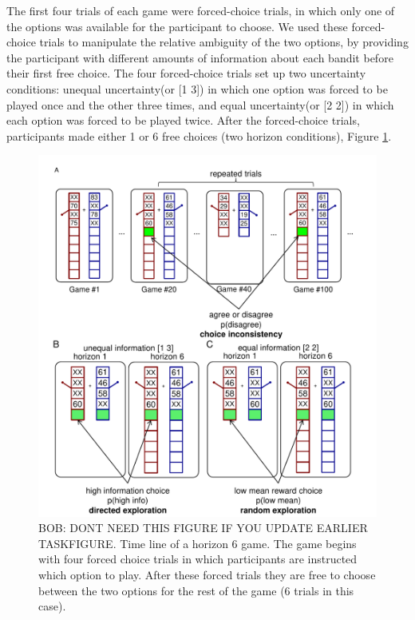 \documentclass[12pt]{article}
\begin{document}
	The first four trials of each game were forced-choice trials, in which only one of the options was available for the participant to choose. We used these forced-choice trials to manipulate the relative ambiguity of the two options, by providing the participant with different amounts of information about each bandit before their first free choice. The four forced-choice trials set up two uncertainty conditions: unequal uncertainty(or [1 3]) in which one option was forced to be played once and the other three times, and equal uncertainty(or [2 2]) in which each option was forced to be played twice. After the forced-choice trials, participants made either 1 or 6 free choices (two horizon conditions),  Figure \ref{fig:taskfigb}.
	
	\begin{figure}[H]
		\begin{center}
			\includegraphics[width=\textwidth]{figures/taskfigb.pdf}
			\caption{BOB: DONT NEED THIS FIGURE IF YOU UPDATE EARLIER TASKFIGURE. Time line of a horizon 6 game.  The game begins with four forced choice trials in which participants are instructed which option to play.   After these forced trials they are free to choose between the two options for the rest of the game (6 trials in this case).
			}
			\label{fig:taskfigb}
		\end{center}
	\end{figure}
	
\end{document}
